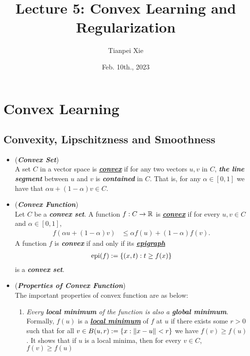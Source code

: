 \documentclass[11pt]{article}
\begin{document}
\title{Lecture 5: Convex Learning and Regularization}
\author{ Tianpei Xie}
\date{Feb. 10th., 2023}
\maketitle
\tableofcontents
\newpage
\section{Convex Learning}
\subsection{Convexity, Lipschitzness and Smoothness}
\begin{itemize}
\item \begin{definition}(\textbf{\emph{Convex Set}})\\
A set $C$ in a vector space is \underline{\emph{\textbf{convex}}} if for any two vectors $u,v$ in $C$, \emph{\textbf{the line segment}} between $u$ and $v$ is \emph{\textbf{contained}} in $C$. That is, for any $\alpha \in [0,1]$ we have that $\alpha u+ (1 - \alpha) v \in C$.
\end{definition}

\item \begin{definition}(\textbf{\emph{Convex Function}})\\
Let $C$ be a \emph{\textbf{convex set}}. A function $f : C \to {\mathbb R}$ is \underline{\emph{\textbf{convex}}} if for every $u,v \in C$ and  $\alpha \in [0,1]$,
\begin{align*}
f(\alpha u+ (1 - \alpha) v ) &\le \alpha f(u)+ (1 - \alpha) f(v). 
\end{align*} A function $f$ is \emph{\textbf{convex}} if and only if its \underline{\emph{\textbf{epigraph}}}
\begin{align*}
\text{epi}(f) := \left\{(x, t):  t \ge f(x) \right\}
\end{align*}  is a \emph{\textbf{convex set}}.
\end{definition}

\item \begin{remark}(\textbf{\emph{Properties of Convex Function}})\\
The important properties of convex function are as below:
\begin{enumerate}
\item \emph{Every \textbf{local minimum} of the function is also a \textbf{global minimum}}.  Formally, $f(u)$ is a \underline{\emph{\textbf{local minimum}}} of $f$ at
$u$ if there exists some $r > 0$ such that for all $v \in B(u,r):= \left\{x: \left\|x - u\right\|_{} < r\right\}$ we have $f(v) \ge f (u)$. It shows that if $u$ is a local minima, then for every $v \in C$, $f(v) \ge f (u)$


\end{enumerate}
\end{remark}
\end{itemize}
\end{document}
